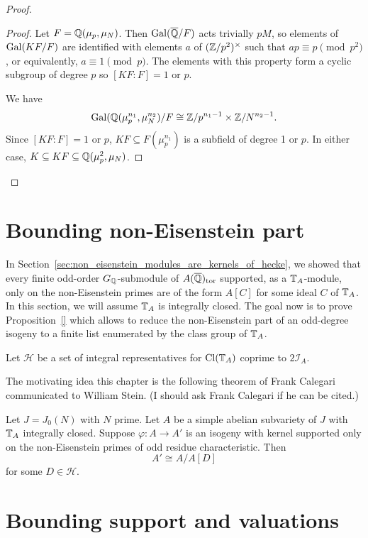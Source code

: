 \documentclass[thesis.tex]{subfiles}
\begin{document}
\begin{proof}
\begin{proof}
        Let $F=\mathbb{Q}(\mu_p, \mu_N)$. Then $\operatorname{Gal}(\overline{\mathbb{Q}}/F)$ acts trivially $pM$,
        so elements of $\operatorname{Gal}(KF/F)$ are identified with elements $a$ of 
        $(\mathbb{Z}/p^2)^\times$ such that $ap\equiv p \pmod{p^2}$, or equivalently,
        $a\equiv 1 \pmod{p}$. The elements with this property form a cyclic
        subgroup of degree $p$ so $[KF:F]=1$ or $p$.

        We have 
        \[
            \operatorname{Gal}(\mathbb{Q}(\mu_p ^{n_1}, \mu_N ^{n_2})/F \cong \mathbb{Z}/p^{n_1-1} \times
            \mathbb{Z}/N^{n_2-1}.
        \]
        Since $[KF:F]=1$ or $p$, $KF\subseteq F(\mu_p ^{n_1})$ is a subfield of
        degree 1 or $p$. In either case, $K\subseteq KF \subseteq \mathbb{Q}(\mu_p ^2,
        \mu_N)$.
    \end{proof}
\end{proof}



\section{Bounding non-Eisenstein part}%
\label{sec:bounding_non_eisenstein_part}

In Section~\ref{sec:non_eisenstein_modules_are_kernels_of_hecke}, we showed
that every finite odd-order $G_{\mathbb{Q}}$-submodule of $A(\overline{\mathbb{Q}})_{\mathrm{tor}}$ supported, as
a $\mathbb{T}_A$-module, only on the non-Eisenstein primes are of the form $A[C]$ for
some ideal $C$ of $\mathbb{T}_A$. In this section, we will assume $\mathbb{T}_A$ is
integrally closed. The goal now is to prove Proposition~\ref{} which
allows to reduce the non-Eisenstein part of an odd-degree isogeny to a finite
list enumerated by the class group of $\mathbb{T}_A$. 

Let $\mathcal{H}$ be a set of integral representatives for $\operatorname{Cl}(\mathbb{T}_A)$ coprime
to $2\mathcal{I}_A$.

The motivating idea this chapter is the following theorem of Frank Calegari
communicated to William Stein. (I should ask Frank Calegari if he can be
cited.)
\begin{theorem}[F. Calegari]
    Let $J=J_0(N)$ with $N$ prime. Let $A$ be a simple abelian subvariety of
    $J$ with $\mathbb{T}_A$ integrally closed. Suppose $\varphi:A\to A'$ is an isogeny
    with kernel supported only on the non-Eisenstein primes of odd residue
    characteristic. Then
    \[
        A' \cong A/A[D]
    \]
    for some $D\in \mathcal{H}$.
\end{theorem}


\section{Bounding support and valuations}%
\label{sec:bounding_support_and_valuations}
\end{document}

